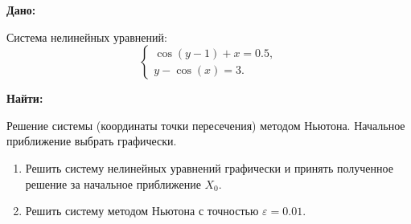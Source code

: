 \textbf{Дано:}

Система нелинейных уравнений:
\[
    \begin{cases}
        \cos(y-1) + x = 0.5, \\
        y - \cos(x) = 3.
    \end{cases}
\]

\textbf{Найти:}

Решение системы (координаты точки пересечения) методом Ньютона.
Начальное приближение выбрать графически.

\begin{enumerate}
    \item Решить систему нелинейных уравнений графически и принять полученное решение за начальное приближение $X_0$.
    \item Решить систему методом Ньютона с точностью $\varepsilon=0.01$.
\end{enumerate}

